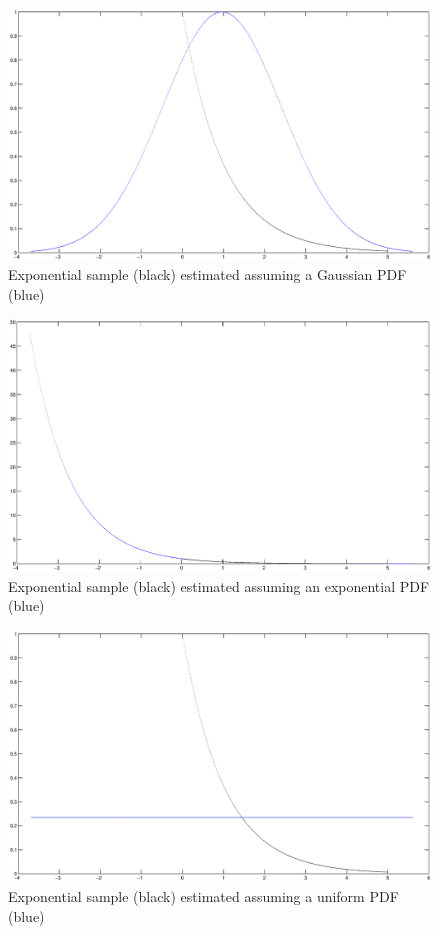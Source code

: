 \begin{figure}
\label{fig:eg}
\includegraphics[scale=0.4]{exp-gauss}
\caption{Exponential sample (black) estimated assuming a Gaussian PDF
(blue)}
\end{figure}

\begin{figure}
\label{fig:ee}
\includegraphics[scale=0.4]{exp-exp}
\caption{Exponential sample (black) estimated assuming an exponential PDF
(blue)}
\end{figure}

\begin{figure}
\label{fig:eu}
\includegraphics[scale=0.4]{exp-uni}
\caption{Exponential sample (black) estimated assuming a uniform PDF
(blue)}
\end{figure}


